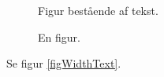 \documentclass{article}
\begin{document}
\begin{figure}
\centering
Figur bestående af tekst.
\caption{En figur.}
\label{figWithText}
\end{figure}

Se figur \ref{figWidthText}.
\end{document}
